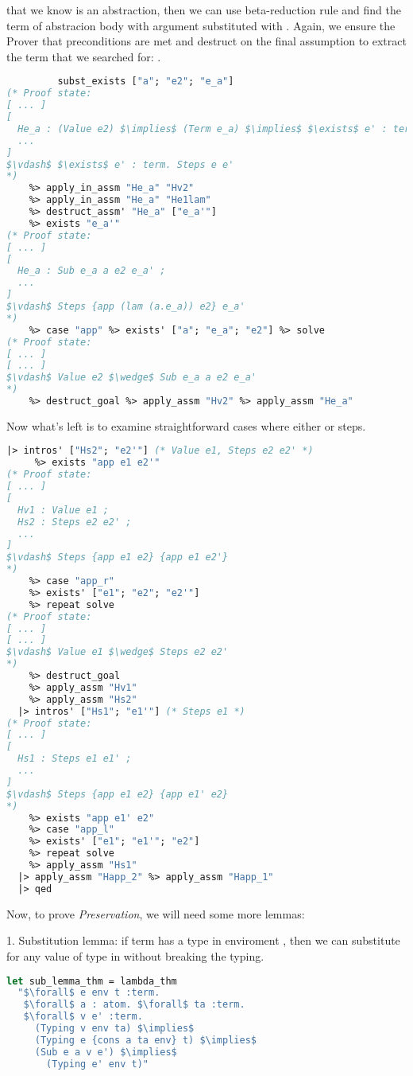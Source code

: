 \documentclass[english, mgr]{iithesis}
\newcommand{\lstt}[1]{\text{{\lstinline[columns=fixed,mathescape]|#1|}}}
\renewcommand{\it}[1]{\textit{#1}}
\begin{document}
that we know \lstt{e1} is an abstraction, then we can use beta-reduction rule
and find the term of abstracion body \lstt{e\_a} with argument \lstt{a}
substituted with \lstt{e2}. Again, we ensure the Prover that preconditions are met
and destruct on the final assumption to extract the term that we searched for: \lstt{e\_a'}.
\begin{lstlisting}[mathescape,language=OCaml,escapebegin=\color{codegreen}]
    %> add_assumption_thm_spec "He_a"
         subst_exists ["a"; "e2"; "e_a"]
(* Proof state:
[ ... ]
[
  He_a : (Value e2) $\implies$ (Term e_a) $\implies$ $\exists$ e' : term. Sub e_a a e2 e' ;
  ...
]
$\vdash$ $\exists$ e' : term. Steps e e'
*)
    %> apply_in_assm "He_a" "Hv2"
    %> apply_in_assm "He_a" "He1lam"
    %> destruct_assm' "He_a" ["e_a'"]
    %> exists "e_a'"
(* Proof state:
[ ... ]
[
  He_a : Sub e_a a e2 e_a' ;
  ...
]
$\vdash$ Steps {app (lam (a.e_a)) e2} e_a'
*)
    %> case "app" %> exists' ["a"; "e_a"; "e2"] %> solve
(* Proof state:
[ ... ]
[ ... ]
$\vdash$ Value e2 $\wedge$ Sub e_a a e2 e_a'
*)
    %> destruct_goal %> apply_assm "Hv2" %> apply_assm "He_a"
\end{lstlisting}
Now what's left is to examine straightforward cases where either \lstt{e1} or \lstt{e2} steps.
\begin{lstlisting}[mathescape,language=OCaml,escapebegin=\color{codegreen}]
  |> intros' ["Hs2"; "e2'"] (* Value e1, Steps e2 e2' *)
     %> exists "app e1 e2'"
(* Proof state:
[ ... ]
[
  Hv1 : Value e1 ;
  Hs2 : Steps e2 e2' ;
  ...
]
$\vdash$ Steps {app e1 e2} {app e1 e2'}
*)
    %> case "app_r"
    %> exists' ["e1"; "e2"; "e2'"]
    %> repeat solve
(* Proof state:
[ ... ]
[ ... ]
$\vdash$ Value e1 $\wedge$ Steps e2 e2'
*)
    %> destruct_goal
    %> apply_assm "Hv1"
    %> apply_assm "Hs2"
  |> intros' ["Hs1"; "e1'"] (* Steps e1 *)
(* Proof state:
[ ... ]
[
  Hs1 : Steps e1 e1' ;
  ...
]
$\vdash$ Steps {app e1 e2} {app e1' e2}
*)
    %> exists "app e1' e2"
    %> case "app_l"
    %> exists' ["e1"; "e1'"; "e2"]
    %> repeat solve
    %> apply_assm "Hs1"
  |> apply_assm "Happ_2" %> apply_assm "Happ_1"
  |> qed
\end{lstlisting}
Now, to prove \it{Preservation}, we will need some more lemmas:

1. Substitution lemma:
if term \lstt{e} has a type \lstt{t} in enviroment \lstt{\{cons a ta env\}},
then we can substitute \lstt{a} for any value \lstt{v} of type \lstt{ta} in \lstt{e} without breaking the typing.
\begin{lstlisting}[mathescape,language=OCaml,escapebegin=\color{codepurple}]
let sub_lemma_thm = lambda_thm
  "$\forall$ e env t :term.
   $\forall$ a : atom. $\forall$ ta :term.
   $\forall$ v e' :term.
     (Typing v env ta) $\implies$
     (Typing e {cons a ta env} t) $\implies$
     (Sub e a v e') $\implies$
       (Typing e' env t)"
\end{lstlisting}
\end{document}

